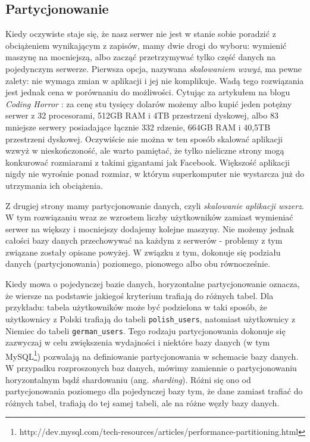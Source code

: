 \subsection{Partycjonowanie}
Kiedy oczywiste staje się, że nasz serwer nie jest w stanie sobie poradzić z obciążeniem wynikającym z zapisów, mamy dwie drogi do wyboru: wymienić maszynę na mocniejszą, albo zacząć przetrzymywać tylko część danych na pojedynczym serwerze.
Pierwsza opcja, nazywana \emph{skalowaniem wzwyż}, ma pewne zalety: nie wymaga zmian w aplikacji i jej nie komplikuje.
Wadą tego rozwiązania jest jednak cena w porównaniu do możliwości.
Cytując za artykułem na blogu \emph{Coding Horror} \cite{codinghorror-scaling-up-vs-out}: za cenę stu tysięcy dolarów możemy albo kupić jeden potężny serwer z 32 procesorami, 512GB RAM i 4TB przestrzeni dyskowej, albo 83 mniejsze serwery posiadające łącznie 332 rdzenie, 664GB RAM i 40,5TB przestrzeni dyskowej.
Oczywiście nie można w ten sposób skalować aplikacji wzwyż w nieskończoność, ale warto pamiętać, że tylko nieliczne strony mogą konkurować rozmiarami z takimi gigantami jak Facebook.
Większość aplikacji nigdy nie wyrośnie ponad rozmiar, w którym superkomputer nie wystarcza już do utrzymania ich obciążenia.


Z drugiej strony mamy partycjonowanie danych, czyli \emph{skalowanie aplikacji wszerz}.
W tym rozwiązaniu wraz ze wzrostem liczby użytkowników zamiast wymieniać serwer na większy i mocniejszy dodajemy kolejne maszyny.
Nie możemy jednak całości bazy danych przechowywać na każdym z serwerów - problemy z tym związane zostały opisane powyżej.
W związku z tym, dokonuje się podziału danych (partycjonowania) poziomego, pionowego albo obu równocześnie.

Kiedy mowa o pojedynczej bazie danych, horyzontalne partycjonowanie oznacza, że wiersze na podstawie jakiegoś kryterium trafiają do różnych tabel.
Dla przykładu: tabela użytkowników może być podzielona w taki sposób, że użytkownicy z Polski trafiają do tabeli \verb=polish_users=, natomiast użytkownicy z Niemiec do tabeli \verb=german_users=.
Tego rodzaju partycjonowania dokonuje się zazwyczaj w celu zwiększenia wydajności i niektóre bazy danych (w tym MySQL\footnote{http://dev.mysql.com/tech-resources/articles/performance-partitioning.html}) pozwalają na definiowanie partycjonowania w schemacie bazy danych.
W przypadku rozproszonych baz danych, mówimy zamiennie o partycjonowaniu horyzontalnym bądź shardowaniu (ang. \emph{sharding}).
Różni się ono od partycjonowania poziomego dla pojedynczej bazy tym, że dane zamiast trafiać do różnych tabel, trafiają do tej samej tabeli, ale na różne węzły bazy danych.

